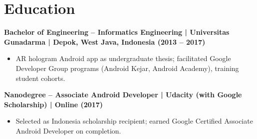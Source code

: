 \documentclass[10pt]{article}
\begin{document}
\section*{Education}
\textbf{Bachelor of Engineering -- Informatics Engineering | Universitas Gunadarma | Depok, West Java, Indonesia (2013 -- 2017)}
\begin{itemize}
\item AR hologram Android app as undergraduate thesis; facilitated Google Developer Group programs (Android Kejar, Android Academy), training student cohorts.
\end{itemize}
 
\textbf{Nanodegree -- Associate Android Developer | Udacity (with Google Scholarship) | Online (2017)}
\begin{itemize}
\item Selected as Indonesia scholarship recipient; earned Google Certified Associate Android Developer on completion.
\end{itemize}
 
\end{document}
